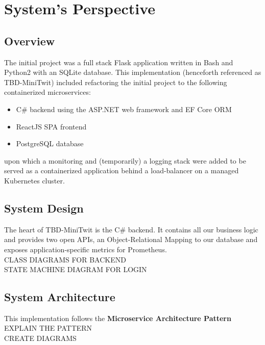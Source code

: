 \section{System's Perspective}
\label{sec:systems_perspective}

\subsection{Overview}
\label{subsec:systems_perspective_overview}
The initial project was a full stack Flask application written in Bash and Python2 with an SQLite database. 
This implementation (henceforth referenced as TBD-MiniTwit) included refactoring the initial project to the following containerized microservices:
\begin{itemize}
    \item C\# backend using the ASP.NET web framework and EF Core ORM
    \item ReactJS SPA frontend
    \item PostgreSQL database
\end{itemize}
upon which a monitoring and (temporarily) a logging stack were added to be served as a containerized application behind a load-balancer on a managed Kubernetes cluster.

\subsection{System Design}
\label{subsec:system_design}
The heart of TBD-MiniTwit is the C\# backend.
It contains all our business logic and provides two open APIs, an Object-Relational Mapping to our database and exposes application-specific metrics for Prometheus. \\
CLASS DIAGRAMS FOR BACKEND \\
STATE MACHINE DIAGRAM FOR LOGIN \\

\subsection{System Architecture}
\label{subsec:system_architecture}
This implementation follows the \textbf{Microservice Architecture Pattern} \\
EXPLAIN THE PATTERN \\
CREATE DIAGRAMS \\


